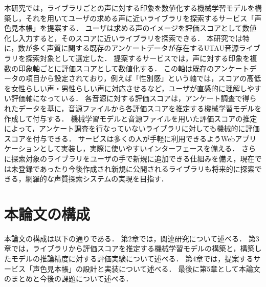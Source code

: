 本研究では，ライブラリごとの声に対する印象を数値化する機械学習モデルを構築し，それを用いてユーザの求める声に近いライブラリを探索するサービス「声色見本帳」を提案する．
ユーザは求める声のイメージを評価スコアとして数値化し入力すると，そのスコアに近いライブラリを探索できる．
本研究では特に，数が多く声質に関する既存のアンケートデータが存在するUTAU音源ライブラリを探索対象として選定した．
提案するサービスでは，声に対する印象を複数の印象軸ごとに評価スコアとして数値化する．
この軸は既存のアンケートデータの項目から設定されており，例えば「性別感」という軸では，スコアの高低を女性らしい声・男性らしい声に対応させるなど，ユーザが直感的に理解しやすい評価軸になっている．
各音源に対する評価スコアは，アンケート調査で得られたデータを基に，音源ファイルから各評価スコアを推定する機械学習モデルを作成して付与する．
機械学習モデルと音源ファイルを用いた評価スコアの推定によって，アンケート調査を行なっていないライブラリに対しても機械的に評価スコアを付与できる．
サービスは多くの人が手軽に利用できるようWebアプリケーションとして実装し，実際に使いやすいインターフェースを備える．
さらに探索対象のライブラリをユーザの手で新規に追加できる仕組みを備え，現在では未登録であったり今後作成され新規に公開されるライブラリも将来的に探索できる，網羅的な声質探索システムの実現を目指す．

\section{本論文の構成}
本論文の構成は以下の通りである．
第2章では，関連研究について述べる．
第3章では，ライブラリから評価スコアを推定する機械学習モデルの構築と，構築したモデルの推論精度に対する評価実験について述べる．
第4章では，提案するサービス「声色見本帳」の設計と実装について述べる．
最後に第5章として本論文のまとめと今後の課題について述べる．

